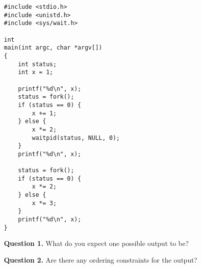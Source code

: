 \documentclass[letterpaper,twocolumn,10pt]{article}
\begin{document}
\pagestyle{fancy}
\fancyfoot[C]{\thepage}

\begin{lstlisting}[style=CStyle]
#include <stdio.h>
#include <unistd.h>
#include <sys/wait.h>

int
main(int argc, char *argv[])
{
    int status;
    int x = 1;

    printf("%d\n", x);
    status = fork();
    if (status == 0) {
        x += 1;
    } else {
        x *= 2;
        waitpid(status, NULL, 0);
    }
    printf("%d\n", x);

    status = fork();
    if (status == 0) {
        x *= 2;
    } else {
        x *= 3;
    }
    printf("%d\n", x);
}
\end{lstlisting}

\break

\noindent
\textbf{Question 1.} What do you expect one possible output to be?

\vspace{16em}

\noindent
\textbf{Question 2.} Are there any ordering constraints for the output?

\vspace{16em}
\end{document}

